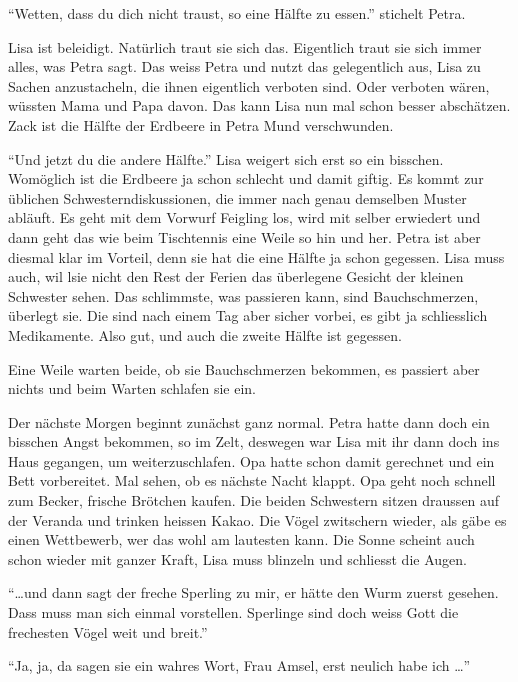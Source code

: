 \enquote{Wetten, dass du dich nicht traust, so eine Hälfte zu essen.} stichelt Petra. 

Lisa ist beleidigt. Natürlich traut sie sich das. Eigentlich traut sie sich immer alles, was Petra sagt. Das weiss Petra und nutzt das gelegentlich aus, Lisa zu Sachen anzustacheln, die ihnen eigentlich verboten sind. Oder verboten wären, wüssten Mama und Papa davon. Das kann Lisa nun mal schon besser abschätzen. Zack ist die Hälfte der Erdbeere in Petra Mund verschwunden.

\enquote{Und jetzt du die andere Hälfte.} Lisa weigert sich erst so ein bisschen. Womöglich ist die Erdbeere ja schon schlecht und damit giftig. Es kommt zur üblichen Schwesterndiskussionen, die immer nach genau demselben Muster abläuft. Es geht mit dem Vorwurf Feigling los, wird mit selber erwiedert und dann geht das wie beim Tischtennis eine Weile so hin und her. Petra ist aber diesmal klar im Vorteil, denn sie hat die eine Hälfte ja schon gegessen. Lisa muss auch, wil lsie nicht den Rest der Ferien das überlegene Gesicht der kleinen Schwester sehen. Das schlimmste, was passieren kann, sind Bauchschmerzen, überlegt sie. Die sind nach einem Tag aber sicher vorbei, es gibt ja schliesslich Medikamente. Also gut, und auch die zweite Hälfte ist gegessen.

Eine Weile warten beide, ob sie Bauchschmerzen bekommen, es passiert aber nichts und beim Warten schlafen sie ein.

\begin{center}
\aldineleft
\end{center}

Der nächste Morgen beginnt zunächst ganz normal. Petra hatte dann doch ein bisschen Angst bekommen, so im Zelt, deswegen war Lisa mit ihr dann doch ins Haus gegangen, um weiterzuschlafen. Opa hatte schon damit gerechnet und ein Bett vorbereitet. Mal sehen, ob es nächste Nacht klappt. Opa geht noch schnell zum Becker, frische Brötchen kaufen. Die beiden Schwestern sitzen draussen auf der Veranda und trinken heissen Kakao. Die Vögel zwitschern wieder, als gäbe es einen Wettbewerb, wer das wohl am lautesten kann. Die Sonne scheint auch schon wieder mit ganzer Kraft, Lisa muss blinzeln und schliesst die Augen.

\enquote{\dots und dann sagt der freche Sperling zu mir, er hätte den Wurm zuerst gesehen. Dass muss man sich einmal vorstellen. Sperlinge sind doch weiss Gott die frechesten Vögel weit und breit.}

\enquote{Ja, ja, da sagen sie ein wahres Wort, Frau Amsel, erst neulich habe ich \dots}

